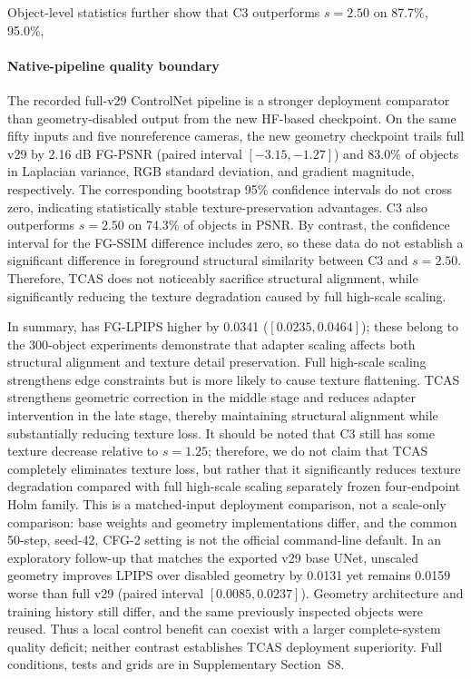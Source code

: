 \documentclass[times,twocolumn,final]{elsarticle}
\providecommand{\DIFadd}[1]{{\protect\color{blue} \sf #1}} %
\providecommand{\DIFdel}[1]{{\protect\color{red} \scriptsize #1}} %
\providecommand{\DIFaddbegin}{} %
\providecommand{\DIFaddend}{} %
\providecommand{\DIFdelbegin}{} %
\providecommand{\DIFdelend}{} %
\begin{document}
\DIFdelbegin \DIFdel{Object-level statistics further show that C3 outperforms $s = 2.50$ on 87.7\%, 95.0\%, }\DIFdelend \DIFaddbegin \paragraph{Native-pipeline quality boundary}
\DIFadd{The recorded full-v29 ControlNet pipeline is a stronger deployment comparator than geometry-disabled output from the new HF-based checkpoint. On the same fifty inputs and five nonreference cameras, the new geometry checkpoint trails full v29 by 2.16 dB FG-PSNR (paired interval $[-3.15,-1.27]$) }\DIFaddend and \DIFdelbegin \DIFdel{83.0\% of objects in Laplacian variance, RGB standard deviation, and gradient magnitude, respectively. The corresponding bootstrap 95\% confidence intervals do not cross zero, indicating statistically stable texture-preservation advantages. C3 also outperforms $s = 2.50$ on 74.3\% of objects in PSNR.
By contrast, the confidence interval for the FG-SSIM difference includes zero, so these data do not establish a significant difference in foreground structural similarity between C3 and $s = 2.50$. Therefore, TCAS does not noticeably sacrifice structural alignment, while significantly reducing the texture degradation caused by full high-scale scaling.
}%

\DIFdel{In summary, }\DIFdelend \DIFaddbegin \DIFadd{has FG-LPIPS higher by 0.0341 ($[0.0235,0.0464]$); these belong to }\DIFaddend the \DIFdelbegin \DIFdel{300-object experiments demonstrate that adapter scaling affects both structural alignment and texture detail preservation. Full high-scale scaling strengthens edge constraints but is more likely to cause texture flattening. TCAS strengthens geometric correction in the middle stage and reduces adapter intervention in the late stage, thereby maintaining structural alignment while substantially reducing texture loss. It should be noted that C3 still has some texture decrease relative to $s = 1.25$; therefore, we do not claim that TCAS completely eliminates texture loss, but rather that it significantly reduces texture degradation compared with full high-scale scaling}\DIFdelend \DIFaddbegin \DIFadd{separately frozen four-endpoint Holm family. This is a matched-input deployment comparison, not a scale-only comparison: base weights and geometry implementations differ, and the common 50-step, seed-42, CFG-2 setting is not the official command-line default. In an exploratory follow-up that matches the exported v29 base UNet, unscaled geometry improves LPIPS over disabled geometry by 0.0131 yet remains 0.0159 worse than full v29 (paired interval $[0.0085,0.0237]$). Geometry architecture and training history still differ, and the same previously inspected objects were reused. Thus a local control benefit can coexist with a larger complete-system quality deficit; neither contrast establishes TCAS deployment superiority. Full conditions, tests and grids are in Supplementary Section~S8}\DIFaddend .
\end{document}
